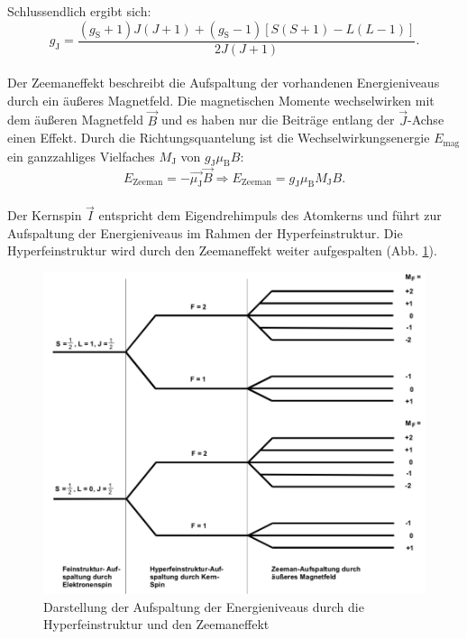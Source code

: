 Schlussendlich ergibt sich:
\begin{equation}
  g_{\text{J}}= \frac{\left(g_{\text{S}} +1 \right)J\left(J+1\right) + \left(g_{\text{S}}-1\right) \left[ S\left(S+1\right)-L\left(L-1\right) \right]   }{2J\left(J+1\right)}.
\label{eqn:landej}
\end{equation}
%
%
\\Der Zeemaneffekt beschreibt die Aufspaltung der vorhandenen Energieniveaus durch ein äußeres Magnetfeld.
Die magnetischen Momente wechselwirken mit dem äußeren Magnetfeld $\vec{B}$ und es haben nur die Beiträge entlang der $\vec{J}$-Achse einen Effekt.
Durch die Richtungsquantelung ist die Wechselwirkungsenergie $E_{\text{mag}}$ ein ganzzahliges Vielfaches $M_{\text{J}}$ von $g_{\text{J}} \mu_{\text{B}} B$:
\begin{equation}
  E_{\text{Zeeman}} = -\vec{\mu_{\text{J}}} \vec{B} \Rightarrow E_{\text{Zeeman}} = g_{\text{J}} \mu_{\text{B}} M_{\text{J}} B.
  \label{eqn:zeeman}
\end{equation}
%
%
\\Der Kernspin $\vec{I}$ entspricht dem Eigendrehimpuls des Atomkerns und führt zur Aufspaltung der Energieniveaus im Rahmen der Hyperfeinstruktur.
Die Hyperfeinstruktur wird durch den Zeemaneffekt weiter aufgespalten (Abb. \ref{fig:kernspin}).
\begin{figure}[h!]
  \centering
  \includegraphics[width=\textwidth]{kernspin1.png}
  \caption{Darstellung der Aufspaltung der Energieniveaus durch die Hyperfeinstruktur und den Zeemaneffekt \cite{1}}
  \label{fig:kernspin}
\end{figure}
